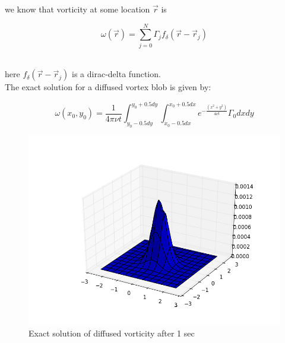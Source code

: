 \documentclass[a4paper,11pt]{article}
\begin{document}
we know that vorticity at some location $\vec{r}$ is\\ 
\begin{centering}
    $$\omega(\vec{r}) = \sum_{j = 0}^{N} \Gamma_{j} f_{\delta}(\vec{r} - \vec{r}_{j})$$\\
\end{centering}

here $f_{\delta}(\vec{r} - \vec{r}_{j})$ is a dirac-delta function.\\

The exact solution for a diffused vortex blob is given by:

\begin{centering}
    $$\omega (x_{0},y_{0}) = \frac{1}{4 \pi \nu t} \int_{y_{0} - 0.5dy}^{y_{0} + 0.5dy}\int_{x_{0} - 0.5dx}^{x_{0} + 0.5dx} e^{-\frac{(x^{2} + y^{2})}{4 \nu t}} \Gamma _{0} dx dy$$
    
    
\end{centering}

\begin{figure}[h]
    \centering
    \includegraphics[width=.8\linewidth]{Exact_solution_of_diffusion_for_1_sec.png}
    \caption{Exact solution of diffused vorticity after 1 sec}
    \label{fig:ex}    
\end{figure}
\end{document}
